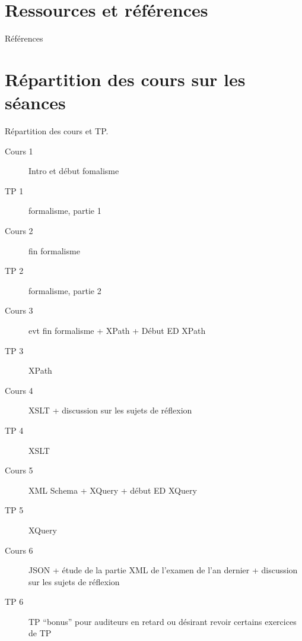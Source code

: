\documentclass[allowframebreaks,9pt]{beamer}
\begin{document}
\section{Ressources et r\'ef\'erences}
\nocite{*}
  

\begin{frame}[allowframebreaks]{R\'ef\'erences} 

\end{frame}




\section{R\'epartition des cours sur les s\'eances}
\begin{frame}
R\'epartition des cours et TP.\\
\begin{description}
\item[Cours 1] Intro et d\'ebut fomalisme
\item[TP 1] formalisme, partie 1
\item[Cours 2]  fin formalisme
\item[TP 2] formalisme, partie 2
\item[Cours 3]  evt fin formalisme + XPath + Début ED XPath
\item[TP 3] XPath
\item[Cours 4]  XSLT + discussion sur les sujets de r\'eflexion
\item[TP 4] XSLT
\item[Cours 5]  XML Schema + XQuery + début ED XQuery
\item[TP 5] XQuery
\item[Cours 6] JSON + étude de la partie XML de l'examen de l'an dernier + discussion sur les sujets de r\'eflexion
\item[TP 6] TP ``bonus'' pour auditeurs en retard ou d\'esirant revoir certains exercices de TP

\end{description}
\end{frame}
\end{document}

